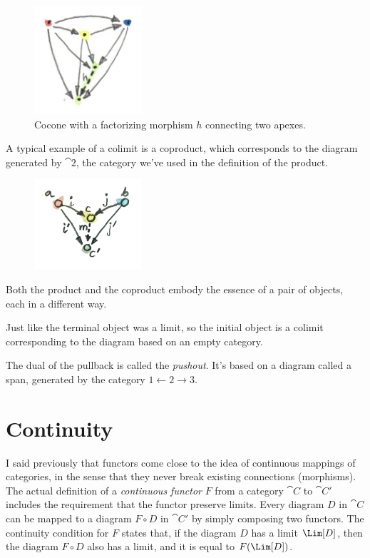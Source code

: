 \begin{figure}[H]
\centering
\includegraphics[width=40mm]{images/colimit.jpg}
\caption{Cocone with a factorizing morphism $h$ connecting two apexes.}
\end{figure}

\noindent
A typical example of a colimit is a coproduct, which corresponds to the
diagram generated by $\cat{2}$, the category we've used in the
definition of the product.

\begin{figure}[H]
\centering
\includegraphics[width=40mm]{images/coproductranking.jpg}
\end{figure}

\noindent
Both the product and the coproduct embody the essence of a pair of
objects, each in a different way.

Just like the terminal object was a limit, so the initial object is a
colimit corresponding to the diagram based on an empty category.

The dual of the pullback is called the \emph{pushout}. It's based on a
diagram called a span, generated by the category
$1\leftarrow2\rightarrow3$.

\section{Continuity}

I said previously that functors come close to the idea of continuous
mappings of categories, in the sense that they never break existing
connections (morphisms). The actual definition of a \emph{continuous
functor} $F$ from a category $\cat{C}$ to $\cat{C'}$ includes the
requirement that the functor preserve limits. Every diagram $D$
in $\cat{C}$ can be mapped to a diagram $F \circ D$ in $\cat{C'}$ by
simply composing two functors. The continuity condition for $F$
states that, if the diagram $D$ has a limit $\Lim[D]$, then
the diagram $F \circ D$ also has a limit, and it is equal to
$F (\Lim[D])$.

